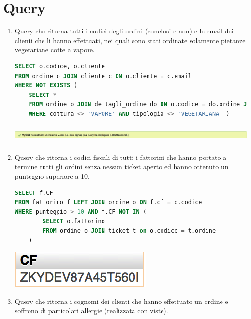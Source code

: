 \documentclass[10pt]{article}
\begin{document}
	\section{Query}
	\begin{enumerate}[noitemsep]
		\item Query che ritorna tutti i codici degli ordini (conclusi e non) e le email dei clienti che li hanno effettuati, nei quali sono stati ordinate solamente pietanze vegetariane cotte a vapore.
\begin{lstlisting}[language=sql]
SELECT o.codice, o.cliente
FROM ordine o JOIN cliente c ON o.cliente = c.email
WHERE NOT EXISTS (
	SELECT *
	FROM ordine o JOIN dettagli_ordine do ON o.codice = do.ordine JOIN pietanza p ON do.pietanza = p.codice
	WHERE cottura <> 'VAPORE' AND tipologia <> 'VEGETARIANA' )
\end{lstlisting}
\begin{center}
\hspace*{-1cm}
\includegraphics[width=19cm, height=1cm]{query1.png}
\hspace*{-1cm}
\end{center}
	\item Query che ritorna i codici fiscali di tutti i fattorini che hanno portato a termine tutti gli ordini senza nessun ticket aperto ed hanno ottenuto un punteggio superiore a 10.
\begin{lstlisting}[language=sql]
SELECT f.CF
FROM fattorino f LEFT JOIN ordine o ON f.cf = o.codice 
WHERE punteggio > 10 AND f.CF NOT IN (
    	SELECT o.fattorino
    	FROM ordine o JOIN ticket t on o.codice = t.ordine
    )
\end{lstlisting}	
\begin{center}
\hspace*{-1cm}
\includegraphics[scale=0.9]{query2.png}
\hspace*{-1cm}
\end{center}
	\item Query che ritorna i cognomi dei clienti che hanno effettuato un ordine e soffrono di particolari allergie (realizzata con viste).
	\begin{lstlisting}[language=sql]

\end{lstlisting}
\end{enumerate}
\end{document}
